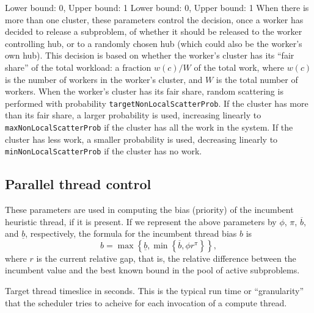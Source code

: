 \groupparams
{}
        {Lower bound: 0, Upper bound: 1}
\groupparams
{}
        {Lower bound: 0, Upper bound: 1}
When there is more than one cluster, these parameters control the
decision, once a worker has decided to release a subproblem, of
whether it should be released to the worker controlling hub, or to a
randomly chosen hub (which could also be the worker's own hub).  This
decision is based on whether the worker's cluster has its ``fair
share'' of the total workload: a fraction $w(c)/W$ of the total work,
where $w(c)$ is the number of workers in the worker's cluster, and $W$
is the total number of workers.  When the worker's cluster has its
fair share, random scattering is performed with probability
\texttt{targetNonLocalScatterProb}.  If the cluster has more than its
fair share, a larger probability is used, increasing linearly to
\texttt{maxNonLocalScatterProb} if the cluster has all the work in the
system.  If the cluster has less work, a smaller probability is used,
decreasing linearly to \texttt{minNonLocalScatterProb} if the cluster
has no work.


\subsection{Parallel thread control}
\label{sec:pthread}
\vspace{-3ex}
\groupparams
{}
\groupparams
{}
\groupparams
{}
These parameters are used in computing the bias (priority) of the
incumbent heuristic thread, if it is present.  If we represent the
above parameters by $\phi$, $\pi$, $\overline{b}$, and
$\underline{b}$, respectively, the formula for the incumbent thread
bias $b$ is
$$
b = \max\left\{\underline{b},
    \min\left\{\overline{b}, \phi r^{\pi} \right\} \right\},
$$ 
where $r$ is the current relative gap, that is, the relative
difference between the incumbent value and the best known bound in the
pool of active subproblems.

Target thread timeslice in seconds.  This is the typical
run time or ``granularity'' that the scheduler tries to acheive for
each invocation of a compute thread.


